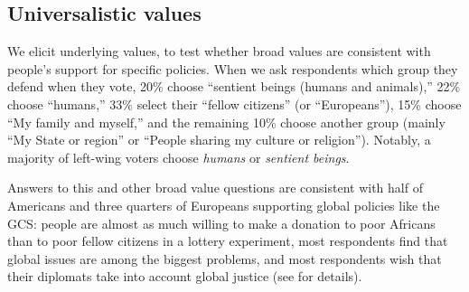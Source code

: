 \begin{bibunit}
\subsection{Universalistic values}\label{subsec:universalistic}

We elicit underlying values, to test whether broad values are consistent with people's support for specific policies. %
When we ask respondents which group they defend when they vote, %
20\% choose ``sentient beings (humans and animals),'' 22\% choose ``humans,'' 33\% select their ``fellow citizens'' (or ``Europeans''), 15\% choose ``My family and myself,'' and the remaining 10\% choose another group (mainly ``My State or region'' or ``People sharing my culture or religion''). 
Notably, a majority of left-wing voters choose \textit{humans} or \textit{sentient beings}. 

Answers to this and other broad value questions are consistent with half of Americans and three quarters of Europeans supporting global policies like the GCS: people are almost as much willing to make a donation to poor Africans than to poor fellow citizens in a lottery experiment, most respondents find that global issues are among the biggest problems, and most respondents wish that their diplomats take into account global justice (see  for details).



\end{bibunit}
